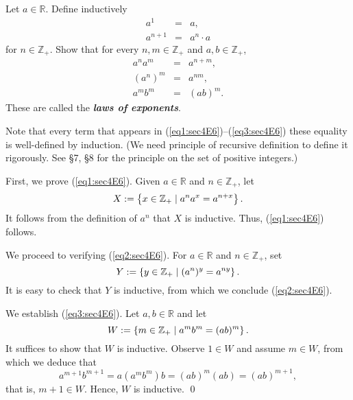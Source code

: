 \documentclass[a4paper,12pt]{article}
\begin{document}
\begin{exe}
	Let \( a \in \mathbb{R} \).
	Define inductively
	\begin{eqnarray*}
		a^1 &=& a,\\
		a^{n+1} &=& a^n \cdot a
	\end{eqnarray*}
	for \( n \in \mathbb{Z}_{+} \).
	Show that for every \( n,m \in \mathbb{Z}_{+} \) and 
	\( a,b \in \mathbb{Z}_{+} \),
	\begin{eqnarray}
		a^{n}a^{m} &=& a^{n+m}\label{eq1:sec4E6},\\
		(a^{n})^{m} &=& a^{nm} \label{eq2:sec4E6},\\
		a^{m}b^{m}&=& (ab)^{m}\label{eq3:sec4E6}.
	\end{eqnarray}
	These are called the \textbf{\textit{laws of exponents}}.
\end{exe}\begin{sol}
	Note that every term that appears in (\ref{eq1:sec4E6})--(\ref{eq3:sec4E6}) these equality is well-defined by induction.
	(We need principle of recursive definition to define it rigorously. See \S7, \S8 for the principle on the set of positive integers.)
	
	First, we prove (\ref{eq1:sec4E6}).
	Given 
	\( a\in \mathbb{R} \)
	and
	\( n \in \mathbb{Z}_{+} \),
	let
	\begin{equation*}
		X:=\left\{ x\in \mathbb{Z}_{+} \;|\; a^{n}a^{x}=a^{n+x}\right\}.
	\end{equation*}
	It follows from the definition of
	\( a^{n} \)
	that
	\( X \)
	is inductive.
	Thus, (\ref{eq1:sec4E6}) follows.
	
	We proceed to verifying (\ref{eq2:sec4E6}).
	For 
	\( a\in \mathbb{R} \)
	and
	\( n \in \mathbb{Z}_{+} \),
	set
	\begin{equation*}
		Y:=\left\{ y\in \mathbb{Z}_{+} \;|\; (a^{n})^{y}=a^{ny} \right\}.
	\end{equation*}
	It is easy to check that
	\( Y \)
	is inductive, from which we conclude (\ref{eq2:sec4E6}).
	
	We establish (\ref{eq3:sec4E6}).
	Let
	\(  a,b \in \mathbb{R} \)
	and let
	\begin{equation*}
		W:=\left\{ m\in \mathbb{Z}_{+}
		\;|\; a^{m}b^{m}=(ab)^{m} \right\}.
	\end{equation*}
	It suffices to show that 
	\( W \) is inductive.
	Observe
	\( 1\in W \)
	and assume
	\( m \in W \),
	from which we deduce that
	\begin{equation*}
		a^{m+1}b^{m+1}
		=
		a (a^{m}b^{m})b
		=
		(ab)^{m}(ab)
		=
		(ab)^{m+1},
	\end{equation*}
	that is,
	\( m+1 \in W \).
	Hence, \( W \) is inductive.
	\qed\end{sol}
\end{document}
